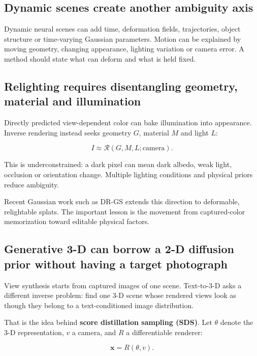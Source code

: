 \subsection{Dynamic scenes create another ambiguity axis}\label{dynamic-scenes-create-another-ambiguity-axis}

Dynamic neural scenes can add time, deformation fields, trajectories, object structure or time-varying Gaussian parameters. Motion can be explained by moving geometry, changing appearance, lighting variation or camera error. A method should state what can deform and what is held fixed.

\subsection{Relighting requires disentangling geometry, material and illumination}\label{relighting-requires-disentangling-geometry-material-and-illumination}

Directly predicted view-dependent color can bake illumination into appearance. Inverse rendering instead seeks geometry \(G\), material \(M\) and light \(L\):

\[
I\approx\mathcal R(G,M,L;\text{camera}).
\]

This is underconstrained: a dark pixel can mean dark albedo, weak light, occlusion or orientation change. Multiple lighting conditions and physical priors reduce ambiguity.

Recent Gaussian work such as DR-GS extends this direction to deformable, relightable splats. The important lesson is the movement from captured-color memorization toward editable physical factors.

\subsection{Generative 3-D can borrow a 2-D diffusion prior without having a target photograph}\label{generative-3-d-can-borrow-a-2-d-diffusion-prior-without-having-a-target-photograph}

View synthesis starts from captured images of one scene. Text-to-3-D asks a different inverse problem: find one 3-D scene whose rendered views look as though they belong to a text-conditioned image distribution.

That is the idea behind \textbf{score distillation sampling (SDS)}. Let \(\theta\) denote the 3-D representation, \(v\) a camera, and \(R\) a differentiable renderer:

\[\mathbf x=R(\theta,v).\]

